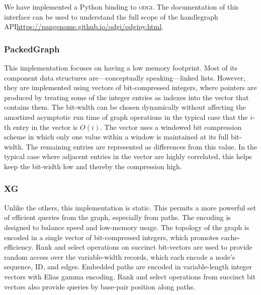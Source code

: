 \documentclass{article}
\begin{document}
We have implemented a Python binding to \textsc{odgi}. 
The documentation of this interface can be used to understand the full scope of the handlegraph API\url{https://pangenome.github.io/odgi/odgipy.html}.


\subsubsection{PackedGraph}

This implementation focuses on having a low memory footprint.
Most of its component data structures are---conceptually speaking---linked lists.
However, they are implemented using vectors of bit-compressed integers, where pointers are produced by treating some of the integer entries as indexes into the vector that contains them.
The bit-width can be chosen dynamically without affecting the amortized asymptotic run time of graph operations in the typical case that the $i$-th entry in the vector is $O(i)$.
The vector uses a windowed bit compression scheme in which only one value within a window is maintained at its full bit-width.
The remaining entries are represented as differences from this value.
In the typical case where adjacent entries in the vector are highly correlated, this helps keep the bit-width low and thereby the compression high. 


\subsubsection{XG}

Unlike the others, this implementation is static.
This permits a more powerful set of efficient queries from the graph, especially from paths.
The encoding is designed to balance speed and low-memory usage.
The topology of the graph is encoded in a single vector of bit-compressed integers, which promotes cache-efficiency.
Rank and select operations on succinct bit-vectors are used to provide random access over the variable-width records, which each encode a node's sequence, ID, and edges.
Embedded paths are encoded in variable-length integer vectors with Elias gamma encoding.
Rank and select operations from succinct bit vectors also provide queries by base-pair position along paths.
\end{document}
